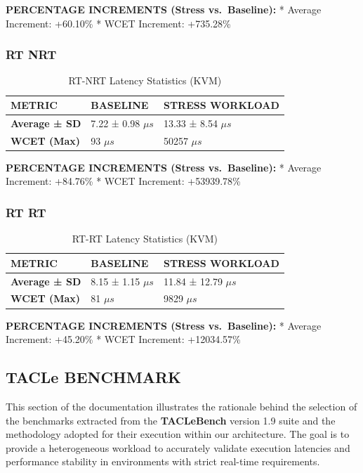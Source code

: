 \textbf{PERCENTAGE INCREMENTS (Stress vs.~Baseline):} * Average
Increment: +60.10\% * WCET Increment: +735.28\%

\subsubsection{RT NRT}\label{rt-nrt}

\begin{table}
\centering
\caption{RT-NRT Latency Statistics (KVM)}
\label{tab:kvm:rt-nrt}
\begin{tabularx}{\linewidth}{@{}YYY@{}}
\toprule
METRIC & BASELINE & STRESS WORKLOAD\tabularnewline
\midrule
\textbf{Average ± SD} & 7.22 ± 0.98 $\mu s$ & 13.33 ± 8.54 $\mu s$\tabularnewline
\textbf{WCET (Max)} & 93 $\mu s$ & 50257 $\mu s$\tabularnewline
\bottomrule
\end{tabularx}
\end{table}

\textbf{PERCENTAGE INCREMENTS (Stress vs.~Baseline):} * Average
Increment: +84.76\% * WCET Increment: +53939.78\%

\subsubsection{RT RT}\label{rt-rt}

\begin{table}
\centering
\caption{RT-RT Latency Statistics (KVM)}
\label{tab:kvm:rt-rt}
\begin{tabularx}{\linewidth}{@{}YYY@{}}
\toprule
METRIC & BASELINE & STRESS WORKLOAD\tabularnewline
\midrule
\textbf{Average ± SD} & 8.15 ± 1.15 $\mu s$ & 11.84 ± 12.79 $\mu s$\tabularnewline
\textbf{WCET (Max)} & 81 $\mu s$ & 9829 $\mu s$\tabularnewline
\bottomrule
\end{tabularx}
\end{table}

\textbf{PERCENTAGE INCREMENTS (Stress vs.~Baseline):} * Average
Increment: +45.20\% * WCET Increment: +12034.57\%

\subsection{TACLe BENCHMARK}\label{tacle-benchmark-2}

This section of the documentation illustrates the rationale behind the
selection of the benchmarks extracted from the \textbf{TACLeBench}
version 1.9 suite and the methodology adopted for their execution within
our architecture. The goal is to provide a heterogeneous workload to
accurately validate execution latencies and performance stability in
environments with strict real-time requirements.

